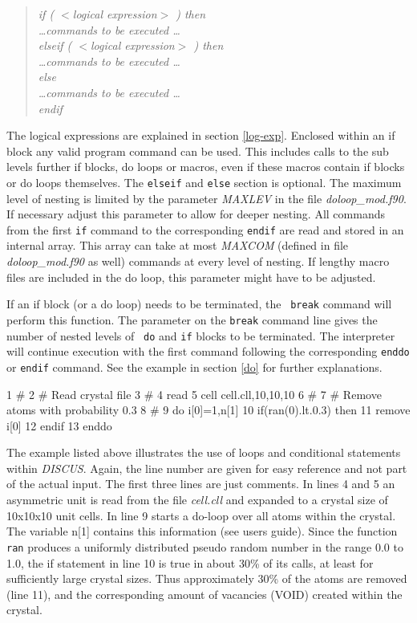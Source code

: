 \begin{quote}
{\it if ( $<$logical expression$>$ ) then \\
     \ldots commands to be executed \ldots \\
     elseif ( $<$logical expression$>$ ) then \\
     \ldots commands to be executed \ldots \\
     else \\
     \ldots commands to be executed \ldots \\
     endif }
\end{quote}

The logical expressions are explained in section \ref{log-exp}.
Enclosed within an if block any valid program command can be
used.  This includes calls to the sub levels further if blocks, do
loops or macros, even if these macros contain if blocks or do loops
themselves.  The {\tt elseif} and {\tt else} section is optional.
The maximum level of nesting is limited by the parameter {\it
MAXLEV} in the file {\it doloop\_mod.f90}.  If necessary adjust this
parameter to allow for deeper nesting.  All commands from the first
{\tt if} command to the corresponding {\tt endif} are read and
stored in an internal array.  This array can take at most {\it
MAXCOM} (defined in file {\it doloop\_mod.f90} as well) commands at every
level of nesting.  If lengthy macro files are included in the do
loop, this parameter might have to be adjusted.  \par

If an if block (or a do loop) needs to be terminated, the {\tt
break} command will perform this function.  The parameter on the
{\tt break} command line gives the number of nested levels of {\tt
do} and {\tt if} blocks to be terminated. The interpreter will
continue execution with the first command following the
corresponding {\tt enddo} or {\tt endif} command.  See the example
in section \ref{do} for further explanations. \par

\begin{MacVerbatim}
     1  #
     2  # Read crystal file
     3  #
     4  read
     5  cell cell.cll,10,10,10
     6  #
     7  # Remove atoms with probability 0.3
     8  #
     9  do i[0]=1,n[1]
    10     if(ran(0).lt.0.3) then
    11        remove i[0]
    12     endif
    13  enddo
\end{MacVerbatim}

The example listed above illustrates the use of loops and
conditional statements within {\it DISCUS}. Again, the line number
are given for easy reference and not part of the actual
input. The first three lines are just comments. In lines 4 and 5 an
asymmetric unit is read from the file {\it cell.cll} and expanded to
a crystal size of 10x10x10 unit cells. In line 9 starts a do-loop
over all atoms within the crystal. The variable n[1] contains this
information (see \Discus users guide). Since
the function {\tt ran} produces a uniformly distributed pseudo
random number in the range 0.0 to 1.0, the if statement in line 10
is true in about 30\% of its calls, at least for sufficiently large 
crystal sizes. Thus approximately 30\% of the atoms are removed
(line 11), and the corresponding amount of vacancies (VOID) created
within the crystal.

